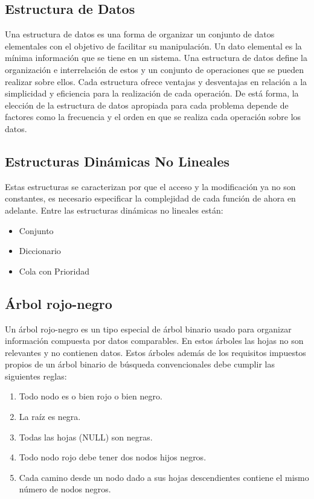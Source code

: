 \subsection{Estructura de Datos}
Una estructura de datos es una forma de organizar un conjunto de datos elementales con el
objetivo de facilitar su manipulación. Un dato elemental es la mínima información que se tiene en
un sistema. Una estructura de datos define la organización e interrelación de estos y un conjunto
de operaciones que se pueden realizar sobre ellos. Cada estructura ofrece ventajas y desventajas
en relación a la simplicidad y eficiencia para la realización de cada operación. De está forma, la
elección de la estructura de datos apropiada para cada problema depende de factores como la
frecuencia y el orden en que se realiza cada operación sobre los datos.

\subsection{Estructuras Dinámicas No Lineales}

Estas estructuras se caracterizan por que el acceso y la modificación ya no son constantes, es
necesario especificar la complejidad de cada función de ahora en adelante.
Entre las estructuras dinámicas no lineales están:

\begin{itemize}
	\item Conjunto
	\item Diccionario
	\item Cola con Prioridad
\end{itemize}

\subsection{Árbol rojo-negro}
Un árbol rojo-negro es un tipo especial de árbol binario usado para organizar información compuesta por datos comparables. En estos árboles las hojas no son relevantes y no contienen datos. Estos árboles además de los requisitos impuestos propios de un árbol binario de búsqueda convencionales debe cumplir las siguientes reglas:

\begin{enumerate}
	\item Todo nodo es o bien rojo o bien negro.
	\item La raíz es negra.
	\item Todas las hojas (NULL) son negras.
	\item Todo nodo rojo debe tener dos nodos hijos negros.
	\item Cada camino desde un nodo dado a sus hojas descendientes contiene el mismo número de nodos negros.
\end{enumerate}

